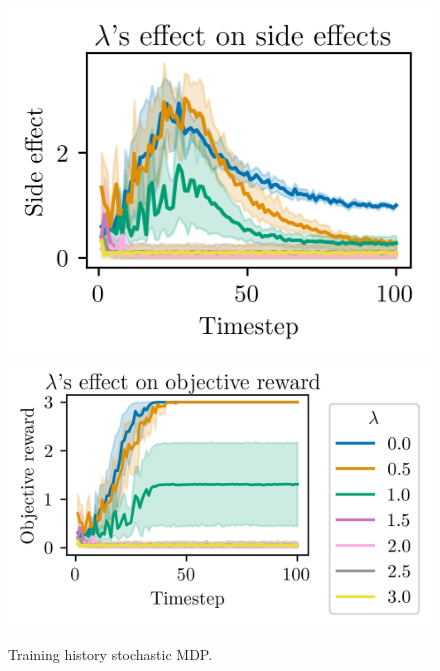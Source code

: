 \documentclass[12pt,A4]{report}
\theoremstyle{definition}
\begin{document}
\begin{appendices}
\begin{figure}[H]
  \centering
  \includegraphics{"./figures/static_8x8_stochastic_side_effects.png"}
  \includegraphics{"./figures/static_8x8_stochastic_objective_reward.png"}
  \caption{Training history stochastic MDP.}
  \label{fig:results_static_8x8_stochastic}
\end{figure}


\end{appendices}
\end{document}
